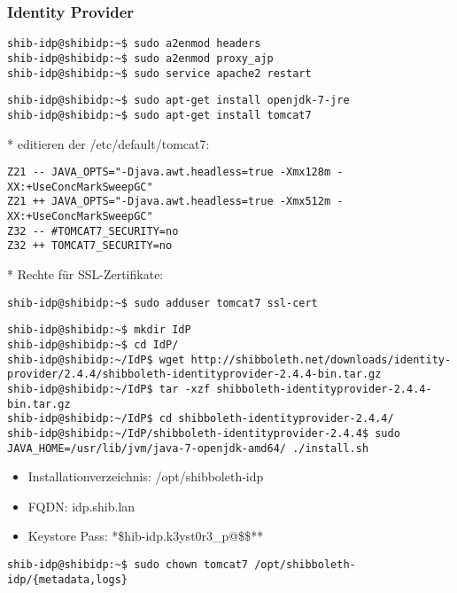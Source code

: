 \subsubsection{Identity Provider}
\begin{lstlisting}
shib-idp@shibidp:~$ sudo a2enmod headers
shib-idp@shibidp:~$ sudo a2enmod proxy_ajp 
shib-idp@shibidp:~$ sudo service apache2 restart
\end{lstlisting}
\begin{lstlisting}
shib-idp@shibidp:~$ sudo apt-get install openjdk-7-jre
shib-idp@shibidp:~$ sudo apt-get install tomcat7
\end{lstlisting}
* editieren der /etc/default/tomcat7:
\begin{lstlisting}
Z21 -- JAVA_OPTS="-Djava.awt.headless=true -Xmx128m -XX:+UseConcMarkSweepGC"
Z21 ++ JAVA_OPTS="-Djava.awt.headless=true -Xmx512m -XX:+UseConcMarkSweepGC"
Z32 -- #TOMCAT7_SECURITY=no
Z32 ++ TOMCAT7_SECURITY=no
\end{lstlisting}				
* Rechte für SSL-Zertifikate:
\begin{lstlisting}
shib-idp@shibidp:~$ sudo adduser tomcat7 ssl-cert
\end{lstlisting}
\begin{lstlisting}
shib-idp@shibidp:~$ mkdir IdP
shib-idp@shibidp:~$ cd IdP/
shib-idp@shibidp:~/IdP$ wget http://shibboleth.net/downloads/identity-provider/2.4.4/shibboleth-identityprovider-2.4.4-bin.tar.gz
shib-idp@shibidp:~/IdP$ tar -xzf shibboleth-identityprovider-2.4.4-bin.tar.gz
shib-idp@shibidp:~/IdP$ cd shibboleth-identityprovider-2.4.4/
shib-idp@shibidp:~/IdP/shibboleth-identityprovider-2.4.4$ sudo JAVA_HOME=/usr/lib/jvm/java-7-openjdk-amd64/ ./install.sh
\end{lstlisting}
\begin{itemize}	
	\item Installationverzeichnis: /opt/shibboleth-idp 
	\item FQDN: idp.shib.lan
	\item Keystore Pass: *\$hib-idp.k3yst0r3\_p@\$\$**
\end{itemize}
\begin{lstlisting}
shib-idp@shibidp:~$ sudo chown tomcat7 /opt/shibboleth-idp/{metadata,logs}
\end{lstlisting}
